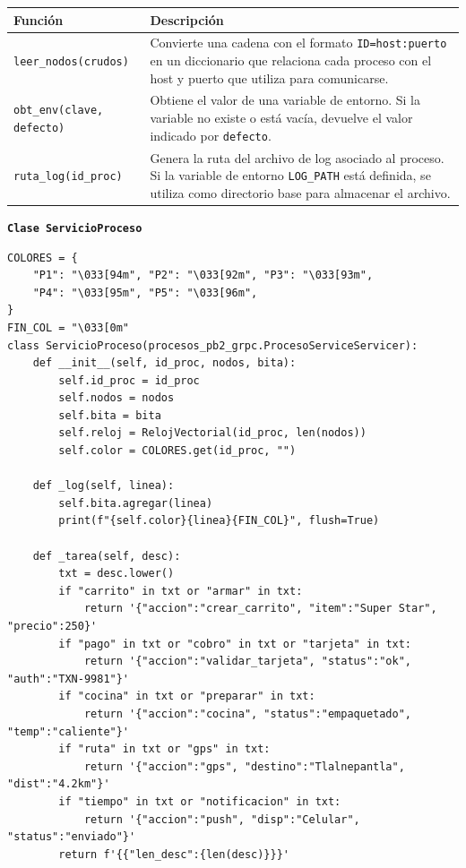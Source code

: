 \documentclass[letterpaper,11pt]{article}
\begin{document}
\begin{center}
\begin{tabular}{>{\ttfamily}l p{9cm}}
\toprule
\textbf{Función} & \textbf{Descripción} \\
\midrule
\texttt{leer\_nodos(crudos)} &
  Convierte una cadena con el formato \texttt{ID=host:puerto} en un
  diccionario que relaciona cada proceso con el host y puerto que utiliza
  para comunicarse. \\[4pt]
\texttt{obt\_env(clave, defecto)} &
  Obtiene el valor de una variable de entorno. Si la variable no existe o
  está vacía, devuelve el valor indicado por \texttt{defecto}. \\[4pt]

\texttt{ruta\_log(id\_proc)} &
  Genera la ruta del archivo de log asociado al proceso. Si la variable de
  entorno \texttt{LOG\_PATH} está definida, se utiliza como directorio base
  para almacenar el archivo. \\
\bottomrule
\end{tabular}
\end{center}

\textbf{\texttt{Clase \texttt{ServicioProceso}}}


\begin{lstlisting}[style=python, caption={process.py — Constructor y métodos privados}]
COLORES = {
    "P1": "\033[94m", "P2": "\033[92m", "P3": "\033[93m",
    "P4": "\033[95m", "P5": "\033[96m",
}
FIN_COL = "\033[0m"
class ServicioProceso(procesos_pb2_grpc.ProcesoServiceServicer):
    def __init__(self, id_proc, nodos, bita):
        self.id_proc = id_proc
        self.nodos = nodos
        self.bita = bita
        self.reloj = RelojVectorial(id_proc, len(nodos))
        self.color = COLORES.get(id_proc, "")
 
    def _log(self, linea):
        self.bita.agregar(linea)
        print(f"{self.color}{linea}{FIN_COL}", flush=True)
 
    def _tarea(self, desc):
        txt = desc.lower()
        if "carrito" in txt or "armar" in txt:
            return '{"accion":"crear_carrito", "item":"Super Star", "precio":250}'
        if "pago" in txt or "cobro" in txt or "tarjeta" in txt:
            return '{"accion":"validar_tarjeta", "status":"ok", "auth":"TXN-9981"}'
        if "cocina" in txt or "preparar" in txt:
            return '{"accion":"cocina", "status":"empaquetado", "temp":"caliente"}'
        if "ruta" in txt or "gps" in txt:
            return '{"accion":"gps", "destino":"Tlalnepantla", "dist":"4.2km"}'
        if "tiempo" in txt or "notificacion" in txt:
            return '{"accion":"push", "disp":"Celular", "status":"enviado"}'
        return f'{{"len_desc":{len(desc)}}}'
\end{lstlisting}
\end{document}
